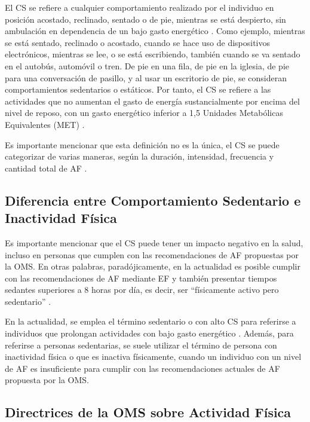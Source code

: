 El CS se refiere a cualquier comportamiento realizado por el individuo en posición acostado, reclinado, sentado o de pie, mientras se está despierto, sin ambulación en dependencia de un bajo gasto energético \citep{Tremblay2017Terminology}. Como ejemplo, mientras se está sentado, reclinado o acostado, cuando se hace uso de dispositivos electrónicos, mientras se lee, o se está escribiendo, también cuando se va sentado en el autobús, automóvil o tren. De pie en una fila, de pie en la iglesia, de pie para una conversación de pasillo, y al usar un escritorio de pie, se consideran comportamientos sedentarios o estáticos. Por tanto, el CS se refiere a las actividades que no aumentan el gasto de energía sustancialmente por encima del nivel de reposo, con un gasto energético inferior a 1,5 Unidades Metabólicas Equivalentes (MET) \citep{Pate2008Evolving,Alvarez2020EnergyExpenditure}.

Es importante mencionar que esta definición no es la única, el CS se puede categorizar de varias maneras, según la duración, intensidad, frecuencia y cantidad total de AF \citep{Tremblay2017Terminology}.

\subsection{Diferencia entre Comportamiento Sedentario e Inactividad Física}
\label{subsec:diferencia_cs_inactividad}

Es importante mencionar que el CS puede tener un impacto negativo en la salud, incluso en personas que cumplen con las recomendaciones de AF propuestas por la OMS. En otras palabras, paradójicamente, en la actualidad es posible cumplir con las recomendaciones de AF mediante EF y también presentar tiempos sedantes superiores a 8 horas por día, es decir, ser ``físicamente activo pero sedentario'' \citep{Reyes2023Actividad}.

En la actualidad, se emplea el término sedentario o con alto CS para referirse a individuos que prolongan actividades con bajo gasto energético \citep{Tremblay2017Terminology}. Además, para referirse a personas sedentarias, se suele utilizar el término de persona con inactividad física o que es inactiva físicamente, cuando un individuo con un nivel de AF es insuficiente para cumplir con las recomendaciones actuales de AF propuesta por la OMS.

\subsection{Directrices de la OMS sobre Actividad Física}
\label{subsec:directrices_oms}

